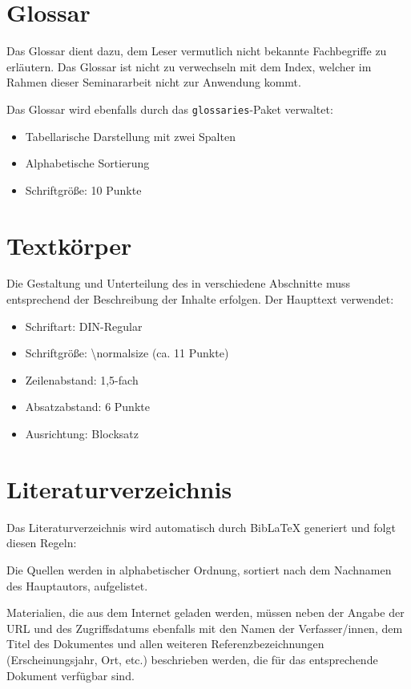 \section{Glossar}
\label{sec:glossar}

Das Glossar dient dazu, dem Leser vermutlich nicht bekannte Fachbegriffe zu erläutern. Das Glossar ist nicht zu verwechseln mit dem Index, welcher im Rahmen dieser Seminararbeit nicht zur Anwendung kommt.

Das Glossar wird ebenfalls durch das \texttt{glossaries}-Paket verwaltet:
\begin{itemize}
	\item Tabellarische Darstellung mit zwei Spalten
	\item Alphabetische Sortierung
	\item Schriftgröße: 10 Punkte
\end{itemize}

\section{Textkörper}
\label{sec:textkoerper}

Die Gestaltung und Unterteilung des  in verschiedene Abschnitte muss entsprechend der Beschreibung der Inhalte erfolgen. Der Haupttext verwendet:
\begin{itemize}
	\item Schriftart: DIN-Regular
	\item Schriftgröße: \textbackslash normalsize (ca. 11 Punkte)
	\item Zeilenabstand: 1,5-fach
	\item Absatzabstand: 6 Punkte
	\item Ausrichtung: Blocksatz
\end{itemize}

\section{Literaturverzeichnis}
\label{sec:literaturverzeichnis_format}

Das Literaturverzeichnis wird automatisch durch BibLaTeX generiert und folgt diesen Regeln:

Die Quellen werden in alphabetischer Ordnung, sortiert nach dem Nachnamen des Hauptautors, aufgelistet.

Materialien, die aus dem Internet geladen werden, müssen neben der Angabe der URL und des Zugriffsdatums ebenfalls mit den Namen der Verfasser/innen, dem Titel des Dokumentes und allen weiteren Referenzbezeichnungen (Erscheinungsjahr, Ort, etc.) beschrieben werden, die für das entsprechende Dokument verfügbar sind.

